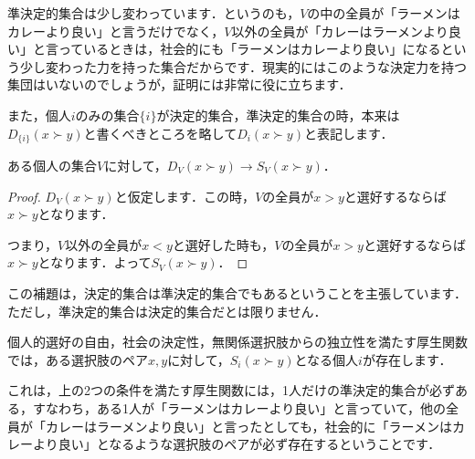 準決定的集合は少し変わっています．というのも，$V$の中の全員が「ラーメンはカレーより良い」と言うだけでなく，$V$以外の全員が「カレーはラーメンより良い」と言っているときは，社会的にも「ラーメンはカレーより良い」になるという少し変わった力を持った集合だからです．現実的にはこのような決定力を持つ集団はいないのでしょうが，証明には非常に役に立ちます．

また，個人$i$のみの集合$\{i\}$が決定的集合，準決定的集合の時，本来は$D_{\{i\}}(x \succ y)$と書くべきところを略して$D_i(x \succ y)$と表記します．

\begin{lem}\label{lem:41}
    ある個人の集合$V$に対して，$D_V(x \succ y) \to S_V(x \succ y)$．
\end{lem}

\begin{proof}
$D_V(x \succ y)$と仮定します．この時，$V$の全員が$x > y$と選好するならば$x \succ y$となります．

つまり，$V$以外の全員が$x < y$と選好した時も，$V$の全員が$x > y$と選好するならば$x \succ y$となります．よって$S_V(x \succ y)$．
\end{proof}

この補題は，決定的集合は準決定的集合でもあるということを主張しています．ただし，準決定的集合は決定的集合だとは限りません．

\begin{lem}\label{lem:42}
    個人的選好の自由，社会の決定性，無関係選択肢からの独立性を満たす厚生関数では，ある選択肢のペア$x,y$に対して，$S_i(x \succ y)$となる個人$i$が存在します．
\end{lem}

これは，上の2つの条件を満たす厚生関数には，1人だけの準決定的集合が必ずある，すなわち，ある1人が「ラーメンはカレーより良い」と言っていて，他の全員が「カレーはラーメンより良い」と言ったとしても，社会的に「ラーメンはカレーより良い」となるような選択肢のペアが必ず存在するということです．

